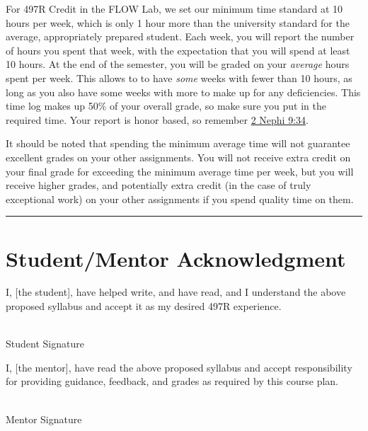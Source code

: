 \documentclass[12pt]{article}
\begin{document}
For 497R Credit in the FLOW Lab, we set our minimum time standard at 10 hours per week, which is only 1 hour more than the university standard for the average, appropriately prepared student.  
Each week, you will report the number of hours you spent that week, with the expectation that you will spend at least 10 hours.
At the end of the semester, you will be graded on your \textit{average} hours spent per week.
This allows to to have \textit{some} weeks with fewer than 10 hours, as long as you also have some weeks with more to make up for any deficiencies.
This time log makes up 50\% of your overall grade, so make sure you put in the required time.
Your report is honor based, so remember \href{https://www.churchofjesuschrist.org/study/scriptures/bofm/2-ne/9?lang=eng}{2 Nephi 9:34}.

It should be noted that spending the minimum average time will not guarantee excellent grades on your other assignments.  
You will not receive extra credit on your final grade for exceeding the minimum average time per week, but you will receive higher grades, and potentially extra credit (in the case of truly exceptional work) on your other assignments if you spend quality time on them.

\vspace{1em}\hrule\vspace{1em}




\section{Student/Mentor Acknowledgment}
\label{sec:acknowledgement}

I, [the student], have helped write, and have read, and I understand the above proposed syllabus and accept it as my desired 497R experience.

\vspace{2em}

\noindent \makebox[2.5in]{\hrulefill} \hspace {1.0in}\makebox[2.5in]{\hrulefill} \\
Student Signature  \\

\bigskip

I, [the mentor], have read the above proposed syllabus and accept responsibility for providing guidance, feedback, and grades as required by this course plan.

\vspace{2em}

\noindent \makebox[2.5in]{\hrulefill} \hspace {1.0in}\makebox[2.5in]{\hrulefill} \\
Mentor Signature  \\
\end{document}
